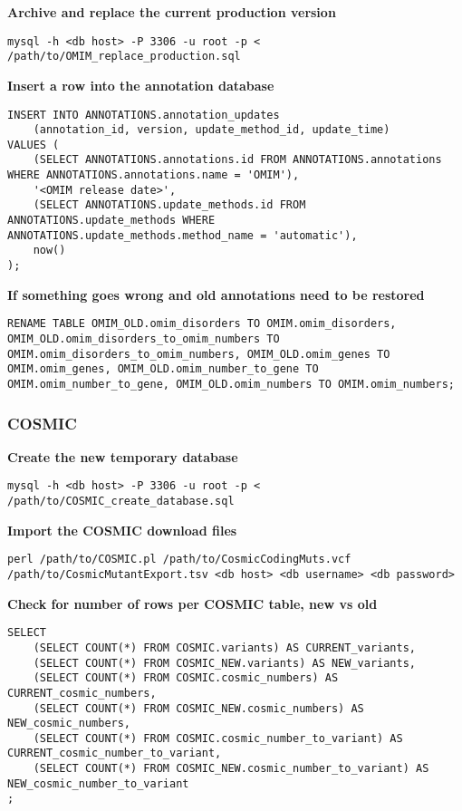 \documentclass[11pt, a4paper]{article}
\begin{document}
\textbf{Archive and replace the current production version}

\texttt{mysql -h <db host> -P 3306 -u root -p < /path/to/OMIM\_replace\_production.sql}

\textbf{Insert a row into the annotation database}

\begin{lstlisting}
INSERT INTO ANNOTATIONS.annotation_updates 
	(annotation_id, version, update_method_id, update_time)
VALUES (
	(SELECT ANNOTATIONS.annotations.id FROM ANNOTATIONS.annotations WHERE ANNOTATIONS.annotations.name = 'OMIM'),
	'<OMIM release date>',
	(SELECT ANNOTATIONS.update_methods.id FROM ANNOTATIONS.update_methods WHERE ANNOTATIONS.update_methods.method_name = 'automatic'),
	now()
);
\end{lstlisting}

\textbf{If something goes wrong and old annotations need to be restored}

\begin{lstlisting}
RENAME TABLE OMIM_OLD.omim_disorders TO OMIM.omim_disorders, OMIM_OLD.omim_disorders_to_omim_numbers TO OMIM.omim_disorders_to_omim_numbers, OMIM_OLD.omim_genes TO OMIM.omim_genes, OMIM_OLD.omim_number_to_gene TO OMIM.omim_number_to_gene, OMIM_OLD.omim_numbers TO OMIM.omim_numbers;
\end{lstlisting}

\subsubsection{COSMIC}

\textbf{Create the new temporary database}

\texttt{mysql -h <db host> -P 3306 -u root -p < /path/to/COSMIC\_create\_database.sql}

\textbf{Import the COSMIC download files}

\texttt{perl /path/to/COSMIC.pl /path/to/CosmicCodingMuts.vcf\\ /path/to/CosmicMutantExport.tsv <db host> <db username> <db password>}

\textbf{Check for number of rows per COSMIC table, new vs old}

\begin{lstlisting}
SELECT 
	(SELECT COUNT(*) FROM COSMIC.variants) AS CURRENT_variants,
	(SELECT COUNT(*) FROM COSMIC_NEW.variants) AS NEW_variants,
	(SELECT COUNT(*) FROM COSMIC.cosmic_numbers) AS CURRENT_cosmic_numbers,
	(SELECT COUNT(*) FROM COSMIC_NEW.cosmic_numbers) AS NEW_cosmic_numbers,
	(SELECT COUNT(*) FROM COSMIC.cosmic_number_to_variant) AS CURRENT_cosmic_number_to_variant,
	(SELECT COUNT(*) FROM COSMIC_NEW.cosmic_number_to_variant) AS NEW_cosmic_number_to_variant
;
\end{lstlisting}
\end{document}
